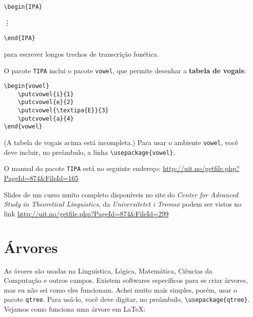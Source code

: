 \begin{center}
\begin{minipage}[h]{1cm}
\verb+\begin{IPA}+

\vdots

\verb+\end{IPA}+
\end{minipage}
\end{center}

para escrever longos trechos de transcrição fonética.

O pacote \texttt{TIPA} inclui o pacote \texttt{vowel}, que permite desenhar a \textbf{tabela de vogais}:

\begin{center}
\begin{minipage}[h]{6cm}
\begin{verbatim}
\begin{vowel}
	\putcvowel{i}{1}
	\putcvowel{e}{2}
	\putcvowel{\textipa{E}}{3}
	\putcvowel{a}{4}
\end{vowel}
\end{verbatim}
\end{minipage}
\begin{minipage}[h]{6cm}
\begin{vowel}
\end{vowel}
\end{minipage}
\end{center}

(A tabela de vogais acima está incompleta.) Para usar o ambiente \texttt{vowel}, você deve incluir, no preâmbulo, a linha \verb+\usepackage{vowel}+.

O manual do pacote \texttt{TIPA} está no seguinte endereço: \href{http://uit.no/getfile.php?PageId=874\&FileId=165}{\textsf{http://uit.no/getfile.php?PageId=874\&FileId=165}}

Slides de um curso muito completo disponíveis no site do \emph{Center for Advanced Study in Theoretical Linguistics}, da \emph{Universitetet i Troms\o} podem ser vistos no link \href{http://uit.no/getfile.php?PageId=874\&FileId=299}{\textsf{http://uit.no/getfile.php?PageId=874\&FileId=299}} 

\section{Árvores}

As ávores são usadas na Linguística, Lógica, Matemática, Ciências da Computação e outros campos. Existem softwares específicos para se criar árvores, mas eu não sei como eles funcionam. Achei muito mais simples, porém, usar o pacote \texttt{qtree}. Para usá-lo, você deve digitar, no preâmbulo, \verb+\usepackage{qtree}+. Vejamos como funciona uma árvore em \LaTeX:


